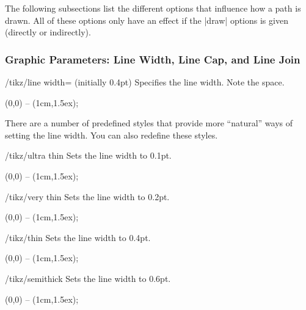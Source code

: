 The following subsections list the different options that influence
how a path is drawn. All of these options only have an effect if the
|draw| options is given (directly or indirectly).

\subsubsection{Graphic Parameters: Line Width, Line Cap, and Line Join}

\label{section-cap-joins}

\begin{key}{/tikz/line width= (initially 0.4pt)}
  Specifies the line width. Note the space.

\begin{codeexample}[]
  \tikz \draw[line width=5pt] (0,0) -- (1cm,1.5ex);
\end{codeexample}
\end{key}

There are a number of predefined styles that provide more ``natural''
ways of setting the line width. You can also redefine these
styles.

\begin{stylekey}{/tikz/ultra thin}
  Sets the line width to 0.1pt.
\begin{codeexample}[]
  \tikz {} (0,0) -- (1cm,1.5ex);
\end{codeexample}
\end{stylekey}

\begin{stylekey}{/tikz/very thin}
  Sets the line width to 0.2pt.
\begin{codeexample}[]
  \tikz {} (0,0) -- (1cm,1.5ex);
\end{codeexample}
\end{stylekey}

\begin{stylekey}{/tikz/thin}
  Sets the line width to 0.4pt.
\begin{codeexample}[]
  \tikz \draw[thin] (0,0) -- (1cm,1.5ex);
\end{codeexample}
\end{stylekey}

\begin{stylekey}{/tikz/semithick}
  Sets the line width to 0.6pt.
\begin{codeexample}[]
  \tikz \draw[semithick] (0,0) -- (1cm,1.5ex);
\end{codeexample}
\end{stylekey}

